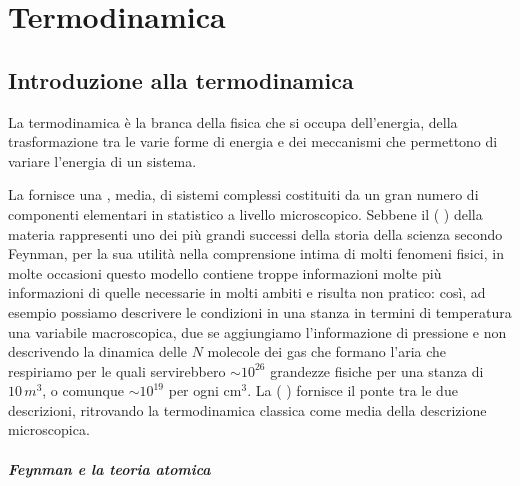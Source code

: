 \documentclass[letterpaper,10pt,italian]{jupyterBook}
\begin{document}
\part{Termodinamica}

\sphinxstepscope


\chapter{Introduzione alla termodinamica}
\label{\detokenize{ch/thermodynamics/foundation:introduzione-alla-termodinamica}}\label{\detokenize{ch/thermodynamics/foundation:physics-hs-thermodynamics-intro}}\label{\detokenize{ch/thermodynamics/foundation::doc}}
\sphinxAtStartPar
La termodinamica è la branca della fisica che si occupa dell’energia, della trasformazione tra le varie forme di energia e dei meccanismi che permettono di variare l’energia di un sistema.

\sphinxAtStartPar
La  fornisce una , media, di sistemi complessi costituiti da un gran numero di componenti elementari in  statistico a livello microscopico. Sebbene il  ( ) della materia rappresenti uno dei più grandi successi della storia della scienza secondo Feynman, per la sua utilità nella comprensione intima di molti fenomeni fisici, in molte occasioni questo modello contiene troppe informazioni \sphinxhyphen{} molte più informazioni di quelle necessarie in molti ambiti \sphinxhyphen{} e risulta non pratico: così, ad esempio possiamo descrivere le condizioni in una stanza in termini di temperatura \sphinxhyphen{} una \sphinxstylestrong{(!)} variabile macroscopica, due se aggiungiamo l’informazione di pressione \sphinxhyphen{} e non descrivendo la dinamica delle \(N\) molecole dei gas che formano l’aria che respiriamo \sphinxhyphen{} per le quali servirebbero \(\sim 10^{26}\) grandezze fisiche per una stanza di \(10 \, m^3\), o comunque \(\sim 10^{19}\) per ogni \(\text{cm}^3\). La  ( ) fornisce il ponte tra le due descrizioni, ritrovando la termodinamica classica come media della descrizione microscopica.
\subsubsection*{Feynman e la teoria atomica}
\end{document}
